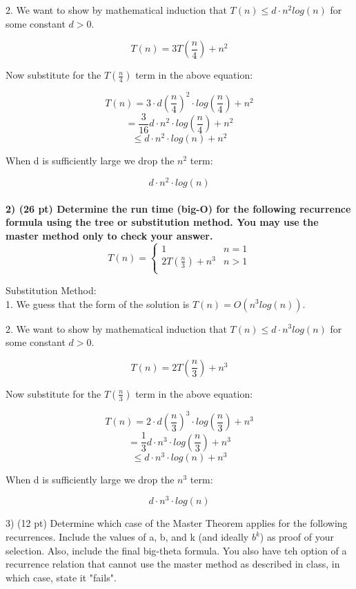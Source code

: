 \documentclass[12pt, a4paper]{article}
\begin{document}
2. We want to show by mathematical induction that $ T(n) \leq d \cdot n^2 log(n) $ for some constant $ d > 0 $. 

\[
  T(n) = 3T \left(\frac{n}{4} \right) + n^2
\]
\begin{center}
  Now substitute for the $T \left(\frac{n}{4} \right)$ term in the above equation:
  \end{center}
\[
  T(n) = 3 \cdot d \left(\frac{n}{4} \right)^2 \cdot log \left(\frac{n}{4} \right) + n^2
\]
\[
  = \frac{3}{16} d \cdot n^2 \cdot log \left(\frac{n}{4} \right) + n^2
\]
\[
  \leq d \cdot n^2 \cdot log(n) + n^2
\]
\begin{center}
  When d is sufficiently large we drop the $ n^2 $ term:
\end{center}
\[
  d \cdot n^2 \cdot log(n)
\]
\\

\textbf{2) (26 pt) Determine the run time (big-O) for the following recurrence formula using the tree or substitution method.
You may use the master method only to check your answer.} \\

\[
  T(n) =  
  \begin{cases}
    1 & n = 1  \\
    2T(\frac{n}{3}) + n^3 & n > 1  \\
  \end{cases}
\]

Substitution Method: \\ 

1. We guess that the form of the solution is $ T(n) = O(n^3 log(n)) $.

2. We want to show by mathematical induction that $ T(n) \leq d \cdot n^3 log(n) $ for some constant $ d > 0 $. 

\[
  T(n) = 2T \left(\frac{n}{3} \right) + n^3
\]
\begin{center}
  Now substitute for the $T \left(\frac{n}{3} \right)$ term in the above equation:
\end{center}
\[
  T(n) = 2 \cdot d \left(\frac{n}{3} \right)^3 \cdot log \left(\frac{n}{3} \right) + n^3
\]
\[
  = \frac{1}{3} d \cdot n^3 \cdot log \left(\frac{n}{3} \right) + n^3
\]
\[
  \leq d \cdot n^3 \cdot log(n) + n^3
\]
\begin{center}
  When d is sufficiently large we drop the $ n^3 $ term:
\end{center}
\[
  d \cdot n^3 \cdot log(n)
\]
\newpage



3) (12 pt) Determine which case of the Master Theorem applies for the following recurrences. Include the values of
a, b, and k (and ideally $b^k$) as proof of your selection. Also, include the final big-theta formula. 
You also have teh option of a recurrence relation that cannot use the master method as described in class, 
in which case, state it "fails". 
\end{document}
